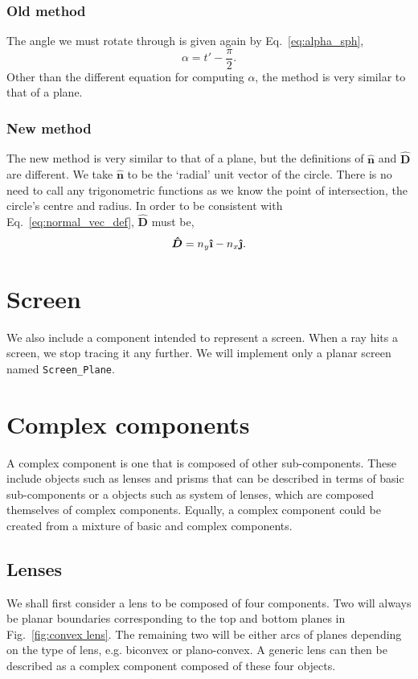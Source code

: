 \documentclass{article}
\let\vec \bm
\newcommand{\uveci}{{\bm{\hat{\textnormal{\bfseries\i}}}}}
\newcommand{\uvecj}{{\bm{\hat{\textnormal{\bfseries\j}}}}}
\begin{document}
\subsubsection{Old method}
The angle we must rotate through is given again by Eq.~\ref{eq:alpha_sph},
\begin{equation}
    \alpha = t' - \frac{\pi}{2}.
\end{equation}
Other than the different equation for computing $\alpha$, the method is very similar to that of a plane.

\subsubsection{New method}
The new method is very similar to that of a plane, but the definitions of $\vec{\hat{n}}$ and $\vec{\hat{D}}$ are different. We take $\vec{\hat{n}}$ to be the `radial' unit vector of the circle. There is no need to call any trigonometric functions as we know the point of intersection, the circle's centre and radius. In order to be consistent with Eq.~\ref{eq:normal_vec_def}, $\vec{\hat{D}}$ must be,
\begin{equation}
    \vec{\hat{D}}
    =
    n_y \uveci
    -
    n_x \uvecj.
\end{equation}

\section{Screen}
We also include a component intended to represent a screen. When a ray hits a screen, we stop tracing it any further. We will implement only a planar screen named \texttt{Screen\_Plane}.

\section{Complex components}
A complex component is one that is composed of other sub-components. These include objects such as lenses and prisms that can be described in terms of basic sub-components or a objects such as system of lenses, which are composed themselves of complex components. Equally, a complex component could be created from a mixture of basic and complex components.

\subsection{Lenses}
We shall first consider a lens to be composed of four components. Two will always be planar boundaries corresponding to the top and bottom planes in Fig.~\ref{fig:convex lens}. The remaining two will be either arcs of planes depending on the type of lens, e.g. biconvex or plano-convex. A generic lens can then be described as a complex component composed of these four objects.
\end{document}
